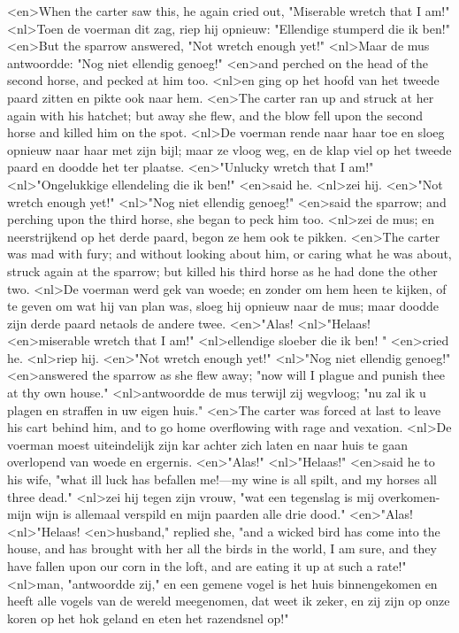 <en>When the carter saw this, he again cried out, "Miserable wretch that I am!"
<nl>Toen de voerman dit zag, riep hij opnieuw: "Ellendige stumperd die ik ben!"
<en>But the sparrow answered, "Not wretch enough yet!"
<nl>Maar de mus antwoordde: "Nog niet ellendig genoeg!"
<en>and perched on the head of the second horse, and pecked at him too.
<nl>en ging op het hoofd van het tweede paard zitten en pikte ook naar hem.
<en>The carter ran up and struck at her again with his hatchet; but away she flew, and the blow fell upon the second horse and killed him on the spot.
<nl>De voerman rende naar haar toe en sloeg opnieuw naar haar met zijn bijl; maar ze vloog weg, en de klap viel op het tweede paard en doodde het ter plaatse.
<en>"Unlucky wretch that I am!"
<nl>"Ongelukkige ellendeling die ik ben!"
<en>said he.
<nl>zei hij.
<en>"Not wretch enough yet!"
<nl>"Nog niet ellendig genoeg!"
<en>said the sparrow; and perching upon the third horse, she began to peck him too.
<nl>zei de mus; en neerstrijkend op het derde paard, begon ze hem ook te pikken.
<en>The carter was mad with fury; and without looking about him, or caring what he was about, struck again at the sparrow; but killed his third horse as he had done the other two.
<nl>De voerman werd gek van woede; en zonder om hem heen te kijken, of  te geven om  wat hij van plan was, sloeg hij opnieuw naar de mus; maar doodde zijn derde paard netaols  de andere twee.
<en>"Alas!
<nl>"Helaas!
<en>miserable wretch that I am!"
<nl>ellendige sloeber die ik ben! "
<en>cried he.
<nl>riep hij.
<en>"Not wretch enough yet!"
<nl>"Nog niet ellendig genoeg!"
<en>answered the sparrow as she flew away; "now will I plague and punish thee at thy own house."
<nl>antwoordde de mus terwijl zij wegvloog; "nu zal ik u plagen en straffen in uw eigen huis."
<en>The carter was forced at last to leave his cart behind him, and to go home overflowing with rage and vexation.
<nl>De voerman moest uiteindelijk  zijn kar achter zich laten en naar huis te gaan overlopend van woede en ergernis.
<en>"Alas!"
<nl>"Helaas!"
<en>said he to his wife, "what ill luck has befallen me!—my wine is all spilt, and my horses all three dead."
<nl>zei hij tegen zijn vrouw, "wat een tegenslag is mij overkomen-mijn wijn is allemaal verspild en mijn paarden  alle drie dood."
<en>"Alas!
<nl>"Helaas!
<en>husband," replied she, "and a wicked bird has come into the house, and has brought with her all the birds in the world, I am sure, and they have fallen upon our corn in the loft, and are eating it up at such a rate!"
<nl>man, "antwoordde zij," en een gemene vogel is het huis binnengekomen en heeft alle vogels van de wereld meegenomen, dat weet ik zeker, en zij zijn op onze koren op het hok geland en eten het razendsnel op!"
